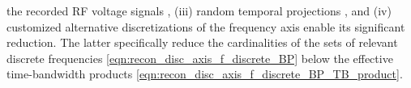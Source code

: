 the recorded \ac{RF} voltage signals
\cite[Sect. III-C.2)]{article:BessonITUFFC2018},
(iii) random temporal projections
\cite{article:ZhangUlt2013}, and
(iv) customized alternative discretizations of
the frequency axis
\cite[Sects. VI-B and VII]{article:ProvostITMI2009} enable
its significant reduction.
The latter specifically reduce
the cardinalities of
the sets of
relevant discrete frequencies
\eqref{eqn:recon_disc_axis_f_discrete_BP} below
the effective time-bandwidth products
\eqref{eqn:recon_disc_axis_f_discrete_BP_TB_product}.
